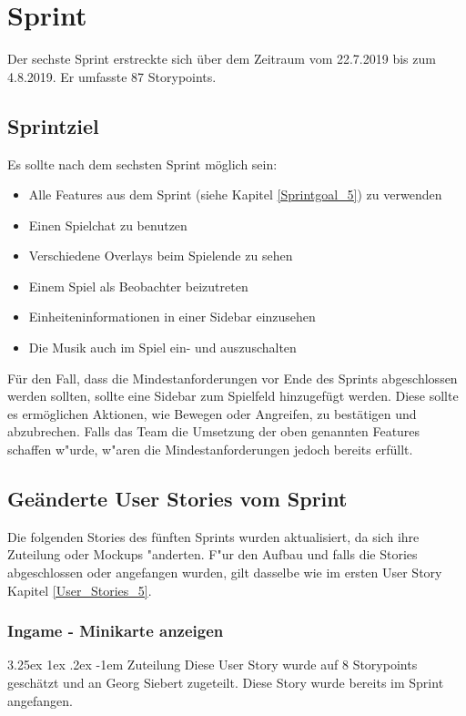 \documentclass[12pt, titlepage]{scrartcl}
\makeatletter
\newcommand{\RN}[1]{%
	\textup{\uppercase\expandafter{\romannumeral#1}}%
}
\renewcommand\paragraph{\@startsection{paragraph}{5}{\z@}%
  {3.25ex \@plus1ex \@minus.2ex}%
  {-1em}%
  {\normalfont\normalsize\bfseries}}
\makeatother
\begin{document}
    \section{Sprint \RN{6}}
    	Der sechste Sprint erstreckte sich \"uber dem Zeitraum vom 22.7.2019 bis zum 4.8.2019. Er umfasste 87 Storypoints.
    	\subsection{Sprintziel}
    		Es sollte nach dem sechsten Sprint m\"oglich sein:
    		\begin{itemize}
    			\item Alle Features aus dem Sprint \RN{5} (siehe Kapitel \ref{Sprintgoal_5}) zu verwenden
    			\item Einen Spielchat zu benutzen
    			\item Verschiedene Overlays beim Spielende zu sehen
    			\item Einem Spiel als Beobachter beizutreten
    			\item Einheiteninformationen in einer Sidebar einzusehen
    			\item Die Musik auch im Spiel ein- und auszuschalten
    		\end{itemize}
    		F\"ur den Fall, dass die Mindestanforderungen vor Ende des Sprints abgeschlossen werden sollten, sollte eine Sidebar zum Spielfeld hinzugef\"ugt werden. Diese sollte es erm\"oglichen Aktionen, wie Bewegen oder Angreifen, zu best\"atigen und abzubrechen. Falls das Team die Umsetzung der oben genannten Features schaffen w"urde, w"aren die Mindestanforderungen jedoch bereits erf\"ullt.
    	\subsection{Ge\"anderte User Stories vom Sprint \RN{5}}
    		Die folgenden Stories des f\"unften Sprints wurden aktualisiert, da sich ihre Zuteilung oder Mockups "anderten. F"ur den Aufbau und falls die Stories abgeschlossen oder angefangen wurden, gilt dasselbe wie im ersten User Story Kapitel \ref{User_Stories_5}.
    		\subsubsection{Ingame - Minikarte anzeigen} \label{changed_user_story_minimap}
    			 \paragraph{Zuteilung}
    				Diese User Story wurde auf 8 Storypoints gesch\"atzt und an Georg Siebert zugeteilt. Diese Story wurde bereits im Sprint \RN{5} angefangen.
\end{document}
